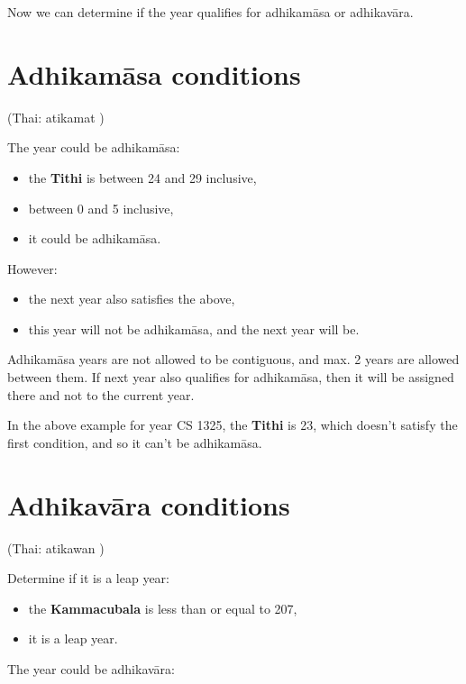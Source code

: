 \documentclass[11pt,oneside]{memoir-article}
\begin{document}
Now we can determine if the year qualifies for adhikamāsa or adhikavāra.

\section{Adhikamāsa conditions}
\label{sec-4-3}
\label{adhikamasa-years}

(Thai: atikamat )

The year could be adhikamāsa:

\begin{itemize}
\item {} the \textbf{Tithi} is between 24 and 29 inclusive,
\item {} between 0 and 5 inclusive,
\item {} it could be adhikamāsa.
\end{itemize}

However:

\begin{itemize}
\item {} the next year also satisfies the above,
\item {} this year will not be adhikamāsa, and the next year will be.
\end{itemize}

Adhikamāsa years are not allowed to be contiguous, and max. 2 years are allowed
between them. If next year also qualifies for adhikamāsa, then it will be
assigned there and not to the current year.

In the above example for year CS 1325, the \textbf{Tithi} is 23, which doesn't satisfy
the first condition, and so it can't be adhikamāsa.

\section{Adhikavāra conditions}
\label{sec-4-4}
\label{adhikavara-years}

(Thai: atikawan )

Determine if it is a leap year:

\begin{itemize}
\item {} the \textbf{Kammacubala} is less than or equal to 207,
\item {} it is a leap year.
\end{itemize}

The year could be adhikavāra:
\end{document}

